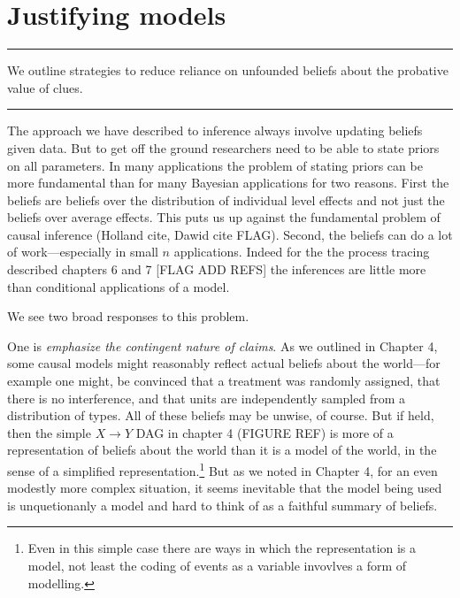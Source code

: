 \documentclass[12pt,]{book}
\let\rmarkdownfootnote\footnote%
\def\footnote{\protect\rmarkdownfootnote}
\begin{document}
\hypertarget{justifying-models}{%
\chapter{Justifying models}\label{justifying-models}}

\begin{center}\rule{0.5\linewidth}{\linethickness}\end{center}

We outline strategies to reduce reliance on unfounded beliefs about the probative value of clues.

\begin{center}\rule{0.5\linewidth}{\linethickness}\end{center}

The approach we have described to inference always involve updating beliefs given data. But to get off the ground researchers need to be able to state priors on all parameters. In many applications the problem of stating priors can be more fundamental than for many Bayesian applications for two reasons. First the beliefs are beliefs over the distribution of individual level effects and not just the beliefs over average effects. This puts us up against the fundamental problem of causal inference (Holland cite, Dawid cite FLAG). Second, the beliefs can do a lot of work---especially in small \(n\) applications. Indeed for the the process tracing described chapters 6 and 7 {[}FLAG ADD REFS{]} the inferences are little more than conditional applications of a model.

We see two broad responses to this problem.

One is \emph{emphasize the contingent nature of claims}. As we outlined in Chapter 4, some causal models might reasonably reflect actual beliefs about the world---for example one might, be convinced that a treatment was randomly assigned, that there is no interference, and that units are independently sampled from a distribution of types. All of these beliefs may be unwise, of course. But if held, then the simple \(X \rightarrow Y\) DAG in chapter 4 (FIGURE REF) is more of a representation of beliefs about the world than it is a model of the world, in the sense of a simplified representation.\footnote{Even in this simple case there are ways in which the representation is a model, not least the coding of events as a variable invovlves a form of modelling.} But as we noted in Chapter 4, for an even modestly more complex situation, it seems inevitable that the model being used is unquetionanly a model and hard to think of as a faithful summary of beliefs.
\end{document}
